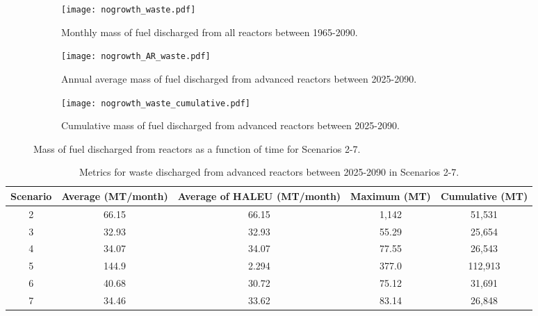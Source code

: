 \begin{figure}
    \centering
    \begin{subfigure}[b]{0.45\textwidth}
        \centering
        \texttt{[image: nogrowth\_waste.pdf]}
        \caption{Monthly mass of fuel discharged from all reactors 
        between 1965-2090.}
        \label{fig:nogrowth_all_waste}
    \end{subfigure}
    \hfill
    \begin{subfigure}[b]{0.45\textwidth}
        \centering
        \texttt{[image: nogrowth\_AR\_waste.pdf]}
        \caption{Annual average mass of fuel discharged from 
        advanced reactors between 2025-2090.}
        \label{fig:nogrowth_AR_waste}
    \end{subfigure}
    \begin{subfigure}[b]{0.45\textwidth}
        \centering
        \texttt{[image: nogrowth\_waste\_cumulative.pdf]}
        \caption{Cumulative mass of fuel discharged from advanced reactors 
        between 2025-2090.}
        \label{fig:nogrowth_waste_cumulative}
    \end{subfigure}
       \caption{Mass of fuel discharged from reactors 
       as a function of time for Scenarios 2-7. }
       \label{fig:nogrowth_waste}
\end{figure}

\begin{table}
    \centering 
    \caption{Metrics for waste discharged from advanced reactors 
    between 2025-2090 in Scenarios 2-7.}
    \label{tab:nogrowth_waste}
    \begin{tabular}{c c c c c}
        \hline
        Scenario & Average (MT/month) & Average of \gls{HALEU} 
        (MT/month) & Maximum (MT) & Cumulative (MT)\\\hline
        2 & 66.15 & 66.15 & 1,142 & 51,531\\
        3 & 32.93 & 32.93 & 55.29 & 25,654\\
        4 & 34.07 & 34.07 & 77.55 & 26,543\\
        5 & 144.9 & 2.294 & 377.0 & 112,913\\
        6 & 40.68 & 30.72 & 75.12 & 31,691\\
        7 & 34.46 & 33.62 & 83.14 & 26,848\\
        \hline
    \end{tabular}
\end{table}

